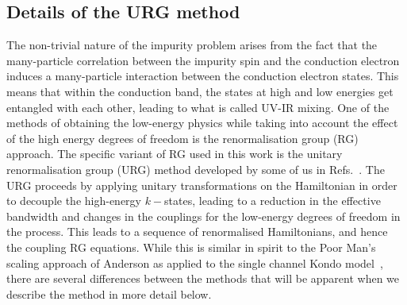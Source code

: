 \documentclass[reprint,onecolumn,prb,superscriptaddress]{revtex4-2}
\begin{document}
{\color{blue}
\subsection{Details of the URG method}

The non-trivial nature of the impurity problem arises from the fact that the many-particle correlation between the impurity spin and the conduction electron induces a many-particle interaction between the conduction electron states. This means that within the conduction band, the states at high and low energies get entangled with each other, leading to what is called UV-IR mixing. One of the methods of obtaining the low-energy physics while taking into account the effect of the high energy degrees of freedom is the renormalisation group (RG) approach. The specific variant of RG used in this work is the unitary renormalisation group (URG) method developed by some of us in Refs.~\cite{santanukagome,anirbanmott1,anirbanmott2,1dhubjhep,siddharthacpi,mukherjeeMERG2022,kondo_urg}. The URG proceeds by applying unitary transformations on the Hamiltonian in order to decouple the high-energy \(k-\)states, leading to a reduction in the effective bandwidth and changes in the couplings for the low-energy degrees of freedom in the process. This leads to a sequence of renormalised Hamiltonians, and hence the coupling RG equations. While this is similar in spirit to the Poor Man's scaling approach of Anderson as applied to the single channel Kondo model~\cite{anderson1970}, there are several differences between the methods that will be apparent when we describe the method in more detail below.

}
\end{document}
